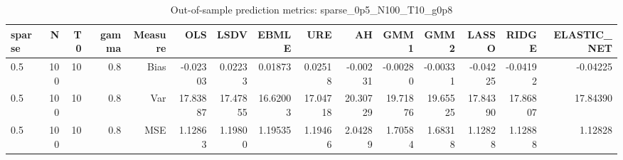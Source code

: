 \begin{table}[!htbp]\centering
\caption{Out-of-sample prediction metrics: sparse_0p5_N100_T10_g0p8}
\label{tab:table3_sparse_0p5_N100_T10_g0p8}
\begin{tabular}{lrrrrrrrrrrrrrr}
\hline
sparse & N & T0 & gamma & Measure & OLS & LSDV & EBMLE & URE & AH & GMM1 & GMM2 & LASSO & RIDGE & ELASTIC_NET \\
\hline
0.5 & 100 & 10 & 0.8 & Bias & -0.02303 & 0.02233 & 0.01873 & 0.02518 & -0.00231 & -0.00280 & -0.00331 & -0.04225 & -0.04192 & -0.04225 \\
0.5 & 100 & 10 & 0.8 & Var & 17.83887 & 17.47855 & 16.62003 & 17.04718 & 20.30729 & 19.71876 & 19.65525 & 17.84390 & 17.86807 & 17.84390 \\
0.5 & 100 & 10 & 0.8 & MSE & 1.12863 & 1.19800 & 1.19535 & 1.19466 & 2.04289 & 1.70584 & 1.68318 & 1.12828 & 1.12888 & 1.12828 \\
\hline
\end{tabular}
\end{table}

